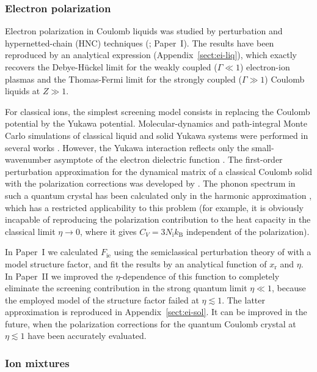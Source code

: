 \documentclass[traditabstract]{aa}
\newcommand{\Nion}{N_\mathrm{i}}
\newcommand{\kB}{k_\mathrm{B}}
\newcommand{\xr}{x_\mathrm{r}}
\begin{document}
\subsubsection{Electron polarization}
\label{sect:ei}

Electron polarization in Coulomb liquids was studied by
perturbation \citep{GalamHansen,YaSha} and hypernetted-chain
(HNC)
techniques (\citealp{ChabAsh,CP98}; Paper~I). The results 
have been
reproduced by an analytical expression 
(Appendix~\ref{sect:ei-liq}), which
exactly recovers the Debye-H\"uckel limit for the
weakly coupled ($\Gamma\ll1$)
electron-ion plasmas and the Thomas-Fermi
limit for the strongly coupled ($\Gamma\gg1$) Coulomb
liquids
at $Z\gg1$.

For classical ions, the simplest screening model consists in
replacing the Coulomb potential by the Yukawa potential.
Molecular-dynamics and path-integral Monte Carlo simulations
of classical liquid and solid Yukawa systems were performed
in several works
\citep[e.g.,][]{Hama-Yukawa,MilitzerGraham}.  However, the
Yukawa interaction reflects only the small-wavenumber
asymptote of the electron dielectric function
\citep{Jancovici,GalamHansen}. The first-order perturbation
approximation for the dynamical matrix of a classical
Coulomb solid with the polarization corrections was
developed by \citet{PollockHansen}. The phonon spectrum in
such a quantum crystal has been calculated only in the
harmonic approximation \citep{Baiko02}, which has a
restricted applicability to this problem (for example, it is
obviously incapable of reproducing the polarization
contribution to the heat capacity in the classical limit
$\eta\to0$, where it gives $C_V=3\Nion\kB$ independent
of the polarization).

In Paper~I we calculated $F_\mathrm{ie}$ using the
semiclassical perturbation theory of \citet{GalamHansen}
with a model structure factor, and fit the results by an
analytical function of $\xr$ and $\eta$. In
Paper~II we improved the $\eta$-dependence of this function
to completely eliminate the screening contribution in
the strong quantum limit $\eta\ll1$, because the employed
model of the structure factor failed at $\eta \lesssim 1$.
The latter approximation is reproduced in
Appendix~\ref{sect:ei-sol}.
It can be improved in the future, when the polarization
corrections for the quantum Coulomb crystal at $\eta
\lesssim 1$ have been accurately evaluated.

\subsubsection{Ion mixtures}
\label{sect:mix}
\end{document}
